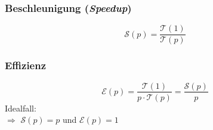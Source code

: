  \subsubsection{Beschleunigung (\textit{Speedup})}
 \[
    \mathcal{S}(p)=\frac{\mathcal{T}(1)}{\mathcal{T}(p)}
 \]
 \subsubsection{Effizienz}
 \[
    \mathcal{E}(p) = \frac{\mathcal{T}(1)}{p\cdot \mathcal{T}(p)} = \frac{\mathcal{S}(p)}{p}
 \]
 Idealfall:\\
 $\Rightarrow$ $\mathcal{S}(p)=p$ und $\mathcal{E}(p)=1$